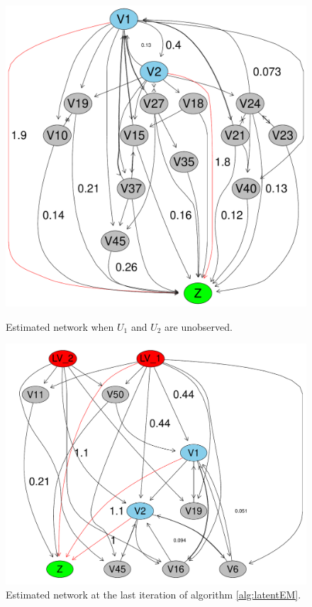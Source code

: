 \documentclass{article}
\begin{document}
\begin{figure}[ht!]
\begin{minipage}[t]{0.33\linewidth}
     \includegraphics[width=\linewidth]{./images/estimated_network_missingdata.pdf}
     \caption{\label{fig_missing} Estimated network when $U_1$ and
      $U_2$ are unobserved.}
   \end{minipage}\hfill
   \begin{minipage}[t]{0.33\linewidth }
    \includegraphics[width=\linewidth]{./images/estimated_network_infered.pdf}
    \caption{\label{fig_estnet_infered} Estimated network at the last
      iteration of algorithm \ref{alg:latentEM}.}
  \end{minipage}
\end{figure}
\end{document}
